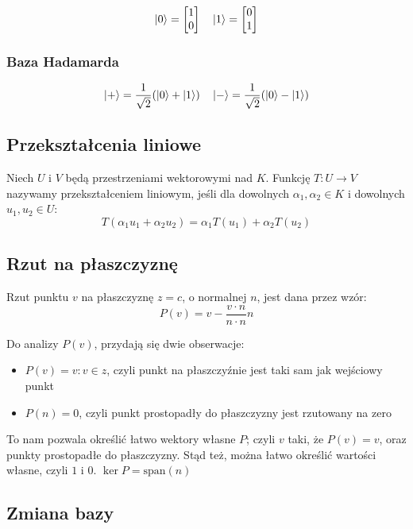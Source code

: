 \documentclass{../notatki}
\begin{document}
$$
\ket{0} =
\begin{bmatrix} 1 \\ 0
\end{bmatrix}\quad \ket{1} =
\begin{bmatrix} 0 \\ 1
\end{bmatrix}
$$

\subsubsection{Baza Hadamarda}

$$
\ket{+} = \frac{1}{\sqrt{2}}(\ket{0} + \ket{1}) \quad \ket{-} =
\frac{1}{\sqrt{2}}(\ket{0} - \ket{1})
$$

\subsection{Przekształcenia liniowe}

Niech $U$ i $V$ będą przestrzeniami wektorowymi nad $K$. Funkcję $T: U \to V$
nazywamy przekształceniem liniowym, jeśli dla dowolnych $\alpha_1,
\alpha_2 \in K$
i dowolnych $u_1, u_2 \in U$:
$$
T(\alpha_1 u_1 + \alpha_2 u_2) = \alpha_1 T(u_1) + \alpha_2 T(u_2)
$$

\subsection{Rzut na płaszczyznę}

Rzut punktu $v$ na płaszczyznę $z = c$, o normalnej $n$, jest dana przez wzór:
$$
P(v) = v - \frac{v \cdot n}{n \cdot n} n
$$

Do analizy $P(v)$, przydają się dwie obserwacje:
\begin{itemize}
  \item $P(v) = v : v \in z$, czyli punkt na płaszczyźnie jest taki
    sam jak wejściowy punkt
  \item $P(n) = 0$, czyli punkt prostopadły do płaszczyzny jest
    rzutowany na zero
\end{itemize}
To nam pozwala określić łatwo wektory własne $P$; czyli $v$ taki, że $P(v) = v$,
oraz punkty prostopadłe do płaszczyzny. Stąd też, można łatwo określić wartości
własne, czyli $1$ i $0$. $\ker P = \textrm{span}(n)$

\subsection{Zmiana bazy}
\end{document}
